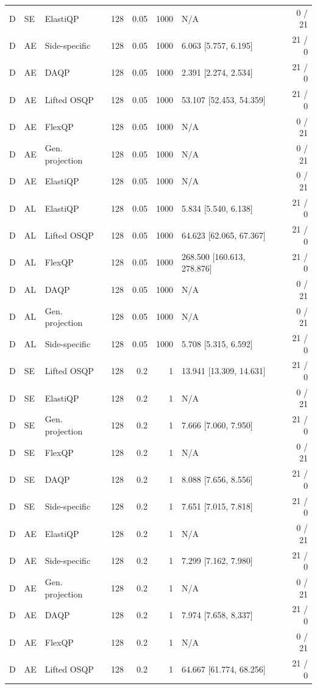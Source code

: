 \begin{longtable}{@{}lllrrrlr@{}}
D & SE & ElastiQP & 128 & 0.05 & 1000 & N/A & 0 / 21 \\
D & AE & Side-specific & 128 & 0.05 & 1000 & 6.063 [5.757, 6.195] & 21 / 0 \\
D & AE & DAQP & 128 & 0.05 & 1000 & 2.391 [2.274, 2.534] & 21 / 0 \\
D & AE & Lifted OSQP & 128 & 0.05 & 1000 & 53.107 [52.453, 54.359] & 21 / 0 \\
D & AE & FlexQP & 128 & 0.05 & 1000 & N/A & 0 / 21 \\
D & AE & Gen. projection & 128 & 0.05 & 1000 & N/A & 0 / 21 \\
D & AE & ElastiQP & 128 & 0.05 & 1000 & N/A & 0 / 21 \\
D & AL & ElastiQP & 128 & 0.05 & 1000 & 5.834 [5.540, 6.138] & 21 / 0 \\
D & AL & Lifted OSQP & 128 & 0.05 & 1000 & 64.623 [62.065, 67.367] & 21 / 0 \\
D & AL & FlexQP & 128 & 0.05 & 1000 & 268.500 [160.613, 278.876] & 21 / 0 \\
D & AL & DAQP & 128 & 0.05 & 1000 & N/A & 0 / 21 \\
D & AL & Gen. projection & 128 & 0.05 & 1000 & N/A & 0 / 21 \\
D & AL & Side-specific & 128 & 0.05 & 1000 & 5.708 [5.315, 6.592] & 21 / 0 \\
D & SE & Lifted OSQP & 128 & 0.2 & 1 & 13.941 [13.309, 14.631] & 21 / 0 \\
D & SE & ElastiQP & 128 & 0.2 & 1 & N/A & 0 / 21 \\
D & SE & Gen. projection & 128 & 0.2 & 1 & 7.666 [7.060, 7.950] & 21 / 0 \\
D & SE & FlexQP & 128 & 0.2 & 1 & N/A & 0 / 21 \\
D & SE & DAQP & 128 & 0.2 & 1 & 8.088 [7.656, 8.556] & 21 / 0 \\
D & SE & Side-specific & 128 & 0.2 & 1 & 7.651 [7.015, 7.818] & 21 / 0 \\
D & AE & ElastiQP & 128 & 0.2 & 1 & N/A & 0 / 21 \\
D & AE & Side-specific & 128 & 0.2 & 1 & 7.299 [7.162, 7.980] & 21 / 0 \\
D & AE & Gen. projection & 128 & 0.2 & 1 & N/A & 0 / 21 \\
D & AE & DAQP & 128 & 0.2 & 1 & 7.974 [7.658, 8.337] & 21 / 0 \\
D & AE & FlexQP & 128 & 0.2 & 1 & N/A & 0 / 21 \\
D & AE & Lifted OSQP & 128 & 0.2 & 1 & 64.667 [61.774, 68.256] & 21 / 0 \\

\end{longtable}
